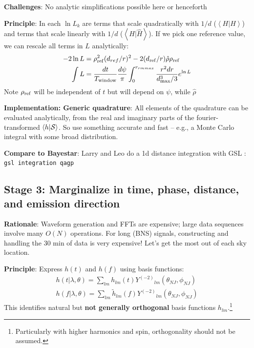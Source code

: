 \documentclass[twocolumn,prd,nofootinbib]{revtex4}
\newcommand\Y[1]{Y^{(#1)}{}}
\newcommand\qmstateproduct[2]{\left\langle#1|#2\right\rangle}
\begin{document}
{\noindent \textbf{Challenges}: No analytic simplifications possible here or henceforth 

\noindent \textbf{Principle}: In each $\ln L_k$  are terms that scale quadratically with $1/d$
($\qmstateproduct{H}{H}$) and terms that scale linearly with $1/d$ ($\qmstateproduct{H}{\hat{H}}$).  If we pick one
reference value, we can rescale all terms in $L$ analytically:
\begin{align}
-2 \ln L &= \rho_{\rm ref}^2 (d_{ref}/r)^2  - 2 (d_{\rm ref}/r) \hat{\rho}\rho_{\rm ref} \\
\int L &=  \frac{dt}{T_{\rm window}} \frac{d\psi}{\pi}\int_0^{r_{rm max}} \frac{r^2 dr}{d_{\rm max}^3/3} e^{\ln L}
\end{align}
Note $\rho_{\rm ref}$ will be independent of $t$ but will depend on $\psi$, while $\hat{\rho}$

\noindent \textbf{Implementation: Generic quadrature}: All elements of the quadrature can be evaluated analytically,
from the real and imaginary parts of the fourier-transformed $\qmstateproduct{h}{{\cal S}}$.  So use something accurate
and fast -- e.g., a Monte Carlo integral with some broad distribution. 


\begin{shaded}
\noindent \textbf{Compare to  Bayestar}: Larry and Leo do a 1d distance integration with GSL : \texttt{gsl integration qagp}
\end{shaded}

}

\subsection{Stage 3: Marginalize in time, phase, distance, and emission direction  }

\noindent \textbf{Rationale}: Waveform generation and FFTs are expensive; large data sequences involve many $O(N)$
operations.   For long (BNS) signals, constructing and handling the 30 min of data is very expensive!  Let's get the most out of each sky location.

\noindent \textbf{Principle}: Express $h(t)$ and $h(f)$ using basis functions:
\begin{eqnarray}
h(t|\lambda,\theta)=\sum_{lm}h_{lm}(t)\Y{-2}_{lm}(\theta_{NJ},\phi_{NJ}) \\
h(f|\lambda,\theta)=\sum_{lm}\tilde{h}_{lm}(f)\Y{-2}_{lm}(\theta_{NJ},\phi_{NJ})
\end{eqnarray}
This identifies natural but \textbf{not   generally orthogonal} basis functions $h_{lm}$.\footnote{Particularly with higher
  harmonics and spin, orthogonality should not be assumed.}  
\end{document}
